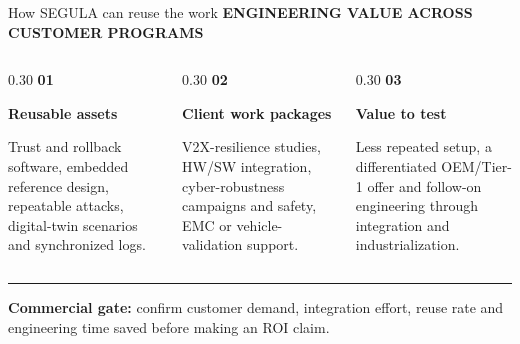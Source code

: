 \documentclass[aspectratio=169,11pt,xcolor=table]{beamer}
\newcommand{\eyebrow}[1]{%
  {\color{BrandCyan}\fontsize{7.5}{9}\selectfont\bfseries\MakeUppercase{#1}}\par\vspace{0.13cm}%
}
\newcommand{\stepnumber}[1]{%
  {\color{BrandCyan}\fontsize{17.5}{19.5}\selectfont\bfseries #1}%
}
\begin{document}
\begin{frame}{How SEGULA can reuse the work}
  \eyebrow{Engineering value across customer programs}
  \vspace{0.06cm}
  \begin{columns}[T,onlytextwidth]
    \begin{column}{0.30\textwidth}
      \stepnumber{01}\par\vspace{0.09cm}
      {\fontsize{12}{14}\selectfont\bfseries Reusable assets}\par
      \vspace{0.13cm}
      {\color{Muted}\fontsize{8.4}{10.1}\selectfont Trust and rollback software, embedded reference design, repeatable attacks, digital-twin scenarios and synchronized logs.}
    \end{column}
    \begin{column}{0.30\textwidth}
      \stepnumber{02}\par\vspace{0.09cm}
      {\fontsize{12}{14}\selectfont\bfseries Client work packages}\par
      \vspace{0.13cm}
      {\color{Muted}\fontsize{8.4}{10.1}\selectfont V2X-resilience studies, HW/SW integration, cyber-robustness campaigns and safety, EMC or vehicle-validation support.}
    \end{column}
    \begin{column}{0.30\textwidth}
      \stepnumber{03}\par\vspace{0.09cm}
      {\fontsize{12}{14}\selectfont\bfseries Value to test}\par
      \vspace{0.13cm}
      {\color{Muted}\fontsize{8.4}{10.1}\selectfont Less repeated setup, a differentiated OEM/Tier-1 offer and follow-on engineering through integration and industrialization.}
    \end{column}
  \end{columns}
  \vspace{0.26cm}
  {\color{BrandMagenta}\rule{0.08cm}{0.78cm}}\hspace{0.12cm}%
  \begin{minipage}[b]{0.90\linewidth}
    {\fontsize{9}{10.8}\selectfont\bfseries Commercial gate:} confirm customer demand, integration effort, reuse rate and engineering time saved before making an ROI claim.

\end{minipage}
\end{frame}
\end{document}
